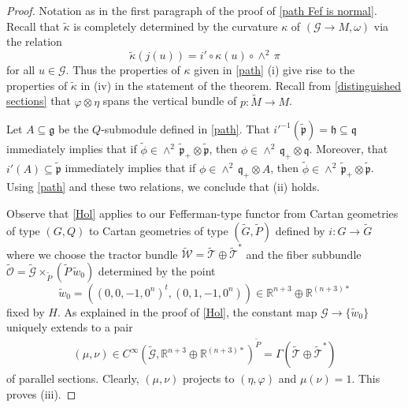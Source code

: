\documentclass[11pt]{amsart}
\begin{document}
\begin{proof}
Notation as in the first paragraph of the proof of \cref{path Fef is normal}. Recall that $\tilde\kappa$ is completely determined by the curvature $\kappa$ of $(\mathcal G\to M,\omega)$ via the relation
\[\tilde\kappa(j(u))=
i'\circ\kappa(u)\circ\wedge^2\,\pi\]
for all $u\in\mathcal G$. Thus the properties of $\kappa$ given in \cref{path} (i) give rise to the properties of $\tilde\kappa$ in (iv) in the statement of the theorem. Recall from \cref{distinguished sections} that $\varphi\otimes\eta$ spans the vertical bundle of $p:\tilde M\to M$.

Let $A\subseteq\mathfrak g$ be the $Q$-submodule defined in \cref{path}. That $i'^{-1}(\tilde{\mathfrak p})=\mathfrak h\subseteq\mathfrak q$ immediately implies that if $\tilde\phi\in\wedge^2\,\tilde{\mathfrak p}_+\otimes\tilde{\mathfrak p}$, then $\phi\in\wedge^2\,\mathfrak q_+\otimes \mathfrak q$. Moreover, that $i'(A)\subseteq\tilde{\mathfrak p}$ immediately implies that if  $\phi\in\wedge^2\,\mathfrak q_+\otimes A$, then $\tilde\phi\in\wedge^2\,\tilde{\mathfrak p}_+\otimes\tilde{\mathfrak p}$. Using \cref{path} and these two relations, we conclude that (ii) holds.

Observe that \cref{Hol} applies to our Fefferman-type functor from Cartan geometries of type $(G,Q)$ to Cartan geometries of type $(\tilde G,\tilde P)$ defined by $i:G\to\tilde G$ where we choose the tractor bundle $\tilde{\mathcal W}=\tilde{\mathcal T}\oplus\tilde{\mathcal T}^*$ and the fiber subbundle $\tilde{\mathcal O}=\tilde{\mathcal G}\times_{\tilde P}(\tilde P\,\tilde w_0)$ determined by the point
\[\tilde w_0=\left((0,0,-1,0^n)^t,(0,1,-1,0^n)\right)\in\mathbb R^{n+3}\oplus\mathbb R^{(n+3)*}\] fixed by $H$. As explained in the proof of \cref{Hol}, the constant map $\mathcal G\to \{\tilde w_0\}$ uniquely extends to a pair
\begin{align*}
(\mu,\nu)\in     
C^\infty(\tilde{\mathcal G},\mathbb R^{n+3}\oplus\mathbb R^{(n+3)*})^{\tilde P}
=\Gamma(\tilde{\mathcal T}\oplus\tilde{\mathcal T}^*)
\end{align*}
of parallel sections. Clearly, $(\mu,\nu)$ projects to $(\eta,\varphi)$ and $\mu(\nu)=1$. This proves (iii).


\end{proof}
\end{document}
